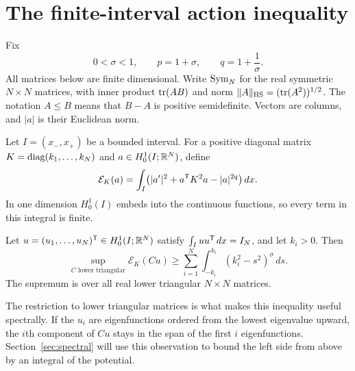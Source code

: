 \section{The finite-interval action inequality}\label{sec:action}

Fix
\[
 0<\sigma<1,\qquad p=1+\sigma,\qquad q=1+\frac1\sigma.
\]
All matrices below are finite dimensional. Write $\operatorname{Sym}_N$ for the real
symmetric $N\times N$ matrices, with inner product $\operatorname{tr}(AB)$ and norm
$\|A\|_{\mathrm{HS}}=(\operatorname{tr}(A^2))^{1/2}$. The notation $A\le B$ means that $B-A$
is positive semidefinite. Vectors are columns, and $|a|$ is their Euclidean norm.

Let $I=(x_-,x_+)$ be a bounded interval. For a positive diagonal matrix
$K=\operatorname{diag}(k_1,\ldots,k_N)$ and $a\in H^1_0(I;\mathbb R^N)$, define
\begin{equation}\label{eq:action}
 \mathcal E_K(a)=\int_I\bigl(|a'|^2+a^{\mathsf T}K^2a-|a|^{2q}\bigr)\,dx.
\end{equation}
In one dimension $H^1_0(I)$ embeds into the continuous functions, so every
term in this integral is finite.

\begin{theorem}\label{thm:action}
Let $u=(u_1,\ldots,u_N)^{\mathsf T}\in H^1_0(I;\mathbb R^N)$ satisfy
$\int_I uu^{\mathsf T}\,dx=I_N$, and let $k_i>0$. Then
\begin{equation}\label{eq:action-bound}
 \sup_{C\text{ lower triangular}}\mathcal E_K(Cu)
 \ge \sum_{i=1}^N\int_{-k_i}^{k_i}(k_i^2-s^2)^\sigma\,ds.
\end{equation}
The supremum is over all real lower triangular $N\times N$ matrices.
\end{theorem}

The restriction to lower triangular matrices is what makes this inequality
useful spectrally. If the $u_i$ are eigenfunctions ordered from the lowest
eigenvalue upward, the $i$th component of $Cu$ stays in the span of the first
$i$ eigenfunctions. Section~\ref{sec:spectral} will use this observation to
bound the left side from above by an integral of the potential.

